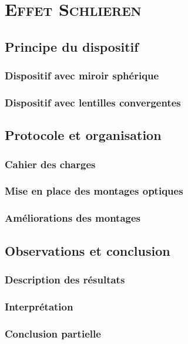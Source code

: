\renewcommand{\chaptername}{\scshape Partie}
\chapter{\normalfont \scshape Effet Schlieren}
\section{Principe du dispositif}
\subsection{Dispositif avec miroir sphérique}
\subsection{Dispositif avec lentilles convergentes}
\section{Protocole et organisation}
\subsection{Cahier des charges}
\subsection{Mise en place des montages optiques}
\subsection{Améliorations des montages}
\section{Observations et conclusion}
\subsection{Description des résultats}
\subsection{Interprétation}
\subsection{Conclusion partielle}